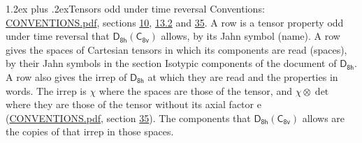 \documentclass[10pt,a4paper]{article}
\makeatletter
\renewcommand\section{\@startsection{section}{1}{\z@}{-3ex plus -1ex minus -.2ex}%
  {1.2ex plus .2ex}{\normalfont\large\sffamily\bfseries\color{parttitle}}}
\numberwithin{equation}{section}
\newcommand{\grp}[1]{\mathsf{#1}}
\newcommand{\irrprod}{\otimes}
\makeatother
\begin{document}
\section{Tensors odd under time reversal}\label{s:time_odd}
Conventions: \href{../../CONVENTIONS.pdf}{CONVENTIONS.pdf}, sections \href{../../../rotation/CONVENTIONS.pdf\#conv.10}{10}, \href{../../../rotation/CONVENTIONS.pdf\#conv.13.2}{13.2} and \href{../../CONVENTIONS.pdf\#conv.35}{35}.
\leavevmode\label{n:head.name.property}A row is a tensor property odd under time reversal that $\grp{D_{8h}}(\grp{C_{8v}})$ allows, by its Jahn symbol (name). \label{n:head.spaces}A row gives the spaces of Cartesian tensors in which its components are read (spaces), by their Jahn symbols in the section Isotypic components of the document of \href{../../../rotation/data/pdf/D8h.pdf}{$\grp{D_{8h}}$}. \label{n:head.properties}A row also gives the irrep of $\grp{D_{8h}}$ at which they are read and the properties in words. The irrep is $\chi$ where the spaces are those of the tensor, and $\chi \irrprod \det$ where they are those of the tensor without its axial factor e (\href{../../CONVENTIONS.pdf}{CONVENTIONS.pdf}, section \href{../../CONVENTIONS.pdf\#conv.35}{35}). The components that $\grp{D_{8h}}(\grp{C_{8v}})$ allows are the copies of that irrep in those spaces.
\end{document}
